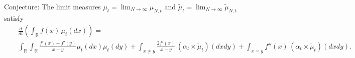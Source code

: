 \documentclass[a4paper,twoside,11pt]{article}
\theoremstyle{plain}
\theoremstyle{definition}
\theoremstyle{remark}
\newcommand\R{\mathbb R}         %
\begin{document}
Conjecture: The limit measures $\mu_t=\lim_{N\to\infty}\mu_{N,t}$ and  $\tilde{\mu}_t=\lim_{N\to\infty}\tilde{\mu}_{N,t}$ satisfy
\begin{eqnarray}&&\frac{d}{dt}\left(\int_\R f(x)\, \mu_t(dx)\right) = \\ \nonumber
&&\int_{\R}\int_{\R} \frac{f'(x)-f'(y)}{x-y} \mu_t(dx)\mu_t(dy) + \int_{x\not=y} \frac{2f'(x)}{x-y} \,
(\alpha_{t}\times \tilde{\mu}_{t})(dxdy) + \int_{x=y} f''(x) \, (\alpha_{t}\times \tilde{\mu}_{t})(dxdy).
\end{eqnarray}
%
%
%
%
%
\end{document}
